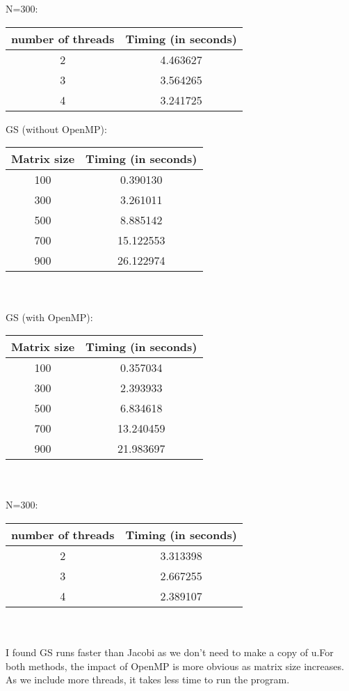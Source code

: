 \documentclass[12pt]{amsart}
\begin{document}
\\\\N=300:\vskip0.2cm
 \begin{tabular}{|c |c|} 
 \hline
 number of threads & Timing (in seconds) \\ [0.5ex] 
 \hline
 2 & 4.463627 \\
 \hline
 3 & 3.564265 \\
 \hline
 4 & 3.241725 \\  [1ex] 
 \hline
 \end{tabular}\newpage
 GS (without OpenMP):\vskip0.2cm
\begin{tabular}{|c |c|} 
 \hline
 Matrix size & Timing (in seconds) \\ [0.5ex] 
 \hline
 100 & 0.390130 \\
 \hline
 300 & 3.261011 \\
 \hline
 500 & 8.885142 \\  
 \hline
 700 & 15.122553 \\  
 \hline
 900 & 26.122974 \\ [1ex] 
 \hline
 \end{tabular}
 \\\\
 GS (with OpenMP):\vskip0.2cm
\begin{tabular}{|c |c|} 
 \hline
 Matrix size & Timing (in seconds) \\ [0.5ex] 
 \hline
 100 & 0.357034 \\
 \hline
 300 & 2.393933 \\
 \hline
 500 & 6.834618 \\  
 \hline
 700 & 13.240459 \\ 
 \hline
 900 &  21.983697\\ [1ex] 
 \hline
\end{tabular}
\\\\N=300:\vskip0.2cm
 \begin{tabular}{|c |c|} 
 \hline
 number of threads & Timing (in seconds) \\ [0.5ex] 
 \hline
 2 & 3.313398 \\
 \hline
 3 & 2.667255 \\
 \hline
 4 &  2.389107\\  [1ex] 
 \hline
 \end{tabular}
 \\\\
 I found GS runs faster than Jacobi as we don't need to make a copy of u.For both methods, the impact of OpenMP is more obvious as matrix size increases. As we include more threads, it takes less time to run the program.
\end{document}
